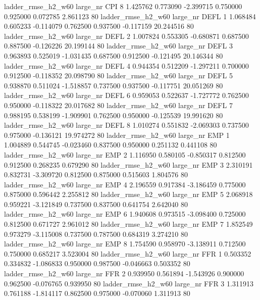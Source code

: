  ladder_rmse_h2_w60   large_nr      CPI                 8  1.425762  0.773090  -2.399715 0.750000 0.925000  0.072785    2.861123 80
 ladder_rmse_h2_w60   large_nr     DEFL                 1  1.068484  0.605233  -0.114079 0.762500 0.937500 -0.117159   20.244516 80
 ladder_rmse_h2_w60   large_nr     DEFL                 2  1.007824  0.553305  -0.680871 0.687500 0.887500 -0.126226   20.199144 80
 ladder_rmse_h2_w60   large_nr     DEFL                 3  0.963893  0.525019  -1.031435 0.687500 0.912500 -0.121495   20.146344 80
 ladder_rmse_h2_w60   large_nr     DEFL                 4  0.944354  0.512209  -1.297211 0.700000 0.912500 -0.118352   20.098790 80
 ladder_rmse_h2_w60   large_nr     DEFL                 5  0.938870  0.511024  -1.518857 0.737500 0.937500 -0.117751   20.051269 80
 ladder_rmse_h2_w60   large_nr     DEFL                 6  0.959053  0.522637  -1.727772 0.762500 0.950000 -0.118322   20.017682 80
 ladder_rmse_h2_w60   large_nr     DEFL                 7  0.988195  0.538199  -1.909901 0.762500 0.950000 -0.125539   19.991620 80
 ladder_rmse_h2_w60   large_nr     DEFL                 8  1.010274  0.551832  -2.069303 0.737500 0.975000 -0.136121   19.974272 80
 ladder_rmse_h2_w60   large_nr      EMP                 1  1.004889  0.544745  -0.023460 0.837500 0.950000  0.251132    0.441108 80
 ladder_rmse_h2_w60   large_nr      EMP                 2  1.116950  0.580105  -0.850317 0.812500 0.912500  0.268235    0.679290 80
 ladder_rmse_h2_w60   large_nr      EMP                 3  2.310191  0.832731  -3.309720 0.812500 0.875000  0.515603    1.804576 80
 ladder_rmse_h2_w60   large_nr      EMP                 4  2.196559  0.917384  -3.186459 0.775000 0.875000  0.596442    2.255812 80
 ladder_rmse_h2_w60   large_nr      EMP                 5  2.068918  0.959221  -3.121849 0.737500 0.837500  0.641754    2.642040 80
 ladder_rmse_h2_w60   large_nr      EMP                 6  1.940608  0.973515  -3.098400 0.725000 0.812500  0.671727    2.961012 80
 ladder_rmse_h2_w60   large_nr      EMP                 7  1.852549  0.973279  -3.115008 0.737500 0.787500  0.684319    3.274210 80
 ladder_rmse_h2_w60   large_nr      EMP                 8  1.754590  0.958970  -3.138911 0.712500 0.750000  0.685217    3.523004 80
 ladder_rmse_h2_w60   large_nr      FFR                 1  0.503352  0.334832  -1.086833 0.950000 0.987500 -0.046663    0.503352 80
 ladder_rmse_h2_w60   large_nr      FFR                 2  0.939950  0.561894  -1.543926 0.900000 0.962500 -0.076765    0.939950 80
 ladder_rmse_h2_w60   large_nr      FFR                 3  1.311913  0.761188  -1.814117 0.862500 0.975000 -0.070060    1.311913 80
